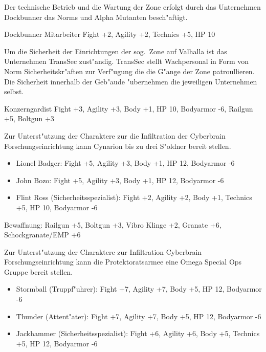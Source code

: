 
Der technische Betrieb und die Wartung der Zone erfolgt durch das Unternehmen Dockbunner das Norms und Alpha Mutanten 
besch"aftigt.

Dockbunner Mitarbeiter Fight +2, Agility +2, Technics +5, HP 10


Um die Sicherheit der Einrichtungen der sog.~Zone auf Valhalla ist das Unternehmen TransSec zust"andig. TransSec stellt
Wachpersonal in Form von Norm Sicherheitskr"aften zur Verf"ugung die die G"ange der Zone patroullieren. Die Sicherheit
innerhalb der Geb"aude "ubernehmen die jeweiligen Unternehmen selbst.

Konzerngardist Fight +3, Agility +3, Body +1, HP 10, Bodyarmor -6, Railgun +5, Boltgun +3


Zur Unterst"utzung der Charaktere zur die Infiltration der Cyberbrain Forschungseinrichtung kann Cynarion bis zu 
drei S"oldner bereit stellen.

\begin{itemize}
    \item Lionel Badger: Fight +5, Agility +3, Body +1, HP 12, Bodyarmor -6
    \item John Bozo: Fight +5, Agility +3, Body +1, HP 12, Bodyarmor -6
    \item Flint Ross (Sicherheitsspezialist): Fight +2, Agility +2, Body +1, Technics +5, HP 10, Bodyarmor -6
\end{itemize}

Bewaffnung: Railgun +5, Boltgun +3, Vibro Klinge +2, Granate +6, Schockgranate/EMP +6 


Zur Unterst"utzung der Charaktere zur Infiltration  Cyberbrain Forschungseinrichtung kann die Protektoratsarmee eine 
Omega Special Ops Gruppe bereit stellen.

\begin{itemize}
    \item Stormball (Truppf"uhrer): Fight +7, Agility +7, Body +5, HP 12, Bodyarmor -6
    \item Thunder (Attent"ater): Fight +7, Agility +7, Body +5, HP 12, Bodyarmor -6
    \item Jackhammer (Sicherheitsspezialist): Fight +6, Agility +6, Body +5, Technics +5, HP 12, Bodyarmor -6
\end{itemize}

